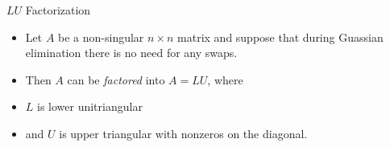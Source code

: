 \documentclass{beamer}
\begin{document}

\begin{frame}{$LU$ Factorization}

\begin{itemize}

\item Let $A$ be a non-singular $n\times n$ matrix and suppose that
during Guassian elimination there is no need for any swaps.

\item Then $A$ can be \emph{factored} into $A=LU$, where

\item $L$ is lower unitriangular
\item and $U$ is upper triangular with nonzeros on the diagonal.

\end{itemize}

\end{frame}
\end{document}
